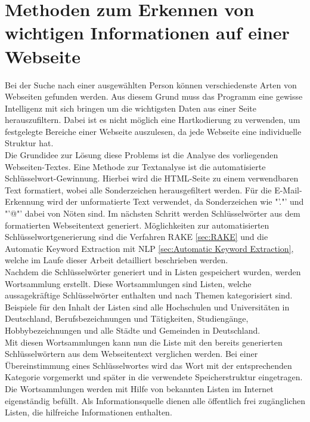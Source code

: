 \section{Methoden zum Erkennen von wichtigen Informationen auf einer Webseite}
\label{subsec:ErkennenVonInformation}
Bei der Suche nach einer ausgewählten Person können verschiedenste Arten von Webseiten gefunden werden. Aus diesem Grund muss das Programm eine gewisse Intelligenz mit sich bringen um die wichtigsten Daten aus einer Seite herauszufiltern. Dabei ist es nicht möglich eine Hartkodierung zu verwenden, um festgelegte Bereiche einer Webseite auszulesen, da jede Webseite eine individuelle Struktur hat.\\
Die Grundidee zur Lösung diese Problems ist die Analyse des vorliegenden Webseiten-Textes. Eine Methode zur Textanalyse ist die automatisierte Schlüsselwort-Gewinnung. Hierbei wird die HTML-Seite zu einem verwendbaren Text formatiert, wobei alle Sonderzeichen herausgefiltert werden. Für die E-Mail-Erkennung wird der unformatierte Text verwendet, da Sonderzeichen wie "'."' und "'@"'  dabei von Nöten sind. Im nächsten Schritt werden Schlüsselwörter aus dem formatierten Webseitentext generiert. Möglichkeiten zur automatisierten Schlüsselwortgenerierung sind die Verfahren RAKE \ref{sec:RAKE} und die Automatic Keyword Extraction mit NLP \ref{sec:Automatic Keyword Extraction}, welche im Laufe dieser Arbeit detailliert beschrieben werden.\\
Nachdem die Schlüsselwörter generiert und in Listen gespeichert wurden, werden Wortsammlung erstellt. Diese Wortsammlungen sind Listen, welche aussagekräftige Schlüsselwörter enthalten und nach Themen kategorisiert sind. Beispiele für den Inhalt der Listen sind alle Hochschulen und Universitäten in Deutschland, Berufsbezeichnungen und Tätigkeiten, Studiengänge, Hobbybezeichnungen und alle Städte und Gemeinden in Deutschland.\\
Mit diesen Wortsammlungen kann nun die Liste mit den bereits generierten Schlüsselwörtern aus dem Webseitentext verglichen werden. Bei einer Übereinstimmung eines Schlüsselwortes wird das Wort mit der entsprechenden Kategorie vorgemerkt und später in die verwendete Speicherstruktur eingetragen. \\
Die Wortsammlungen werden mit Hilfe von bekannten Listen im Internet eigenständig befüllt. Als Informationsquelle dienen alle öffentlich frei zugänglichen Listen, die hilfreiche Informationen enthalten.

